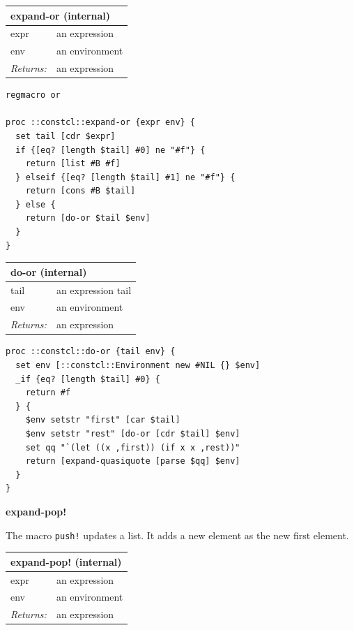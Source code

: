 \documentclass[twoside,9pt]{report}
\begin{document}
\begin{tabular}{ |l l| }
\hline
\multicolumn{2}{|l|}{expand-or (internal)} \\
\hline
expr & an expression \\
env & an environment \\
\textit{Returns:} & an expression \\
\hline
\end{tabular}

\noindent\makebox[\linewidth]{\rule{\linewidth}{0.4pt}}
\begin{lstlisting}
regmacro or
 
proc ::constcl::expand-or {expr env} {
  set tail [cdr $expr]
  if {[eq? [length $tail] #0] ne "#f"} {
    return [list #B #f]
  } elseif {[eq? [length $tail] #1] ne "#f"} {
    return [cons #B $tail]
  } else {
    return [do-or $tail $env]
  }
}
\end{lstlisting}
\noindent\makebox[\linewidth]{\rule{\linewidth}{0.4pt}}
\begin{tabular}{ |l l| }
\hline
\multicolumn{2}{|l|}{do-or (internal)} \\
\hline
tail & an expression tail \\
env & an environment \\
\textit{Returns:} & an expression \\
\hline
\end{tabular}

\noindent\makebox[\linewidth]{\rule{\linewidth}{0.4pt}}
\begin{lstlisting}
proc ::constcl::do-or {tail env} {
  set env [::constcl::Environment new #NIL {} $env]
  _if {eq? [length $tail] #0} {
    return #f
  } {
    $env setstr "first" [car $tail]
    $env setstr "rest" [do-or [cdr $tail] $env]
    set qq "`(let ((x ,first)) (if x x ,rest))"
    return [expand-quasiquote [parse $qq] $env]
  }
}
\end{lstlisting}
\noindent\makebox[\linewidth]{\rule{\linewidth}{0.4pt}}

\textbf{expand-pop!}


The macro \texttt{push!} updates a list. It adds a new element as the new first element.

\begin{tabular}{ |l l| }
\hline
\multicolumn{2}{|l|}{expand-pop! (internal)} \\
\hline
expr & an expression \\
env & an environment \\
\textit{Returns:} & an expression \\
\hline
\end{tabular}
\end{document}
